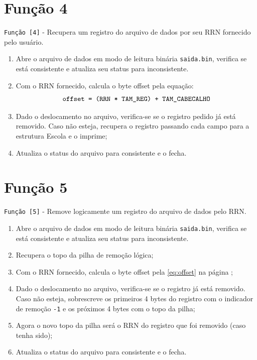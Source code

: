 \documentclass[
	12pt,				%
	openany,			%
	twoside,			%
	a4paper,			%
	english,			%
	french,				%
	spanish,			%
	brazil,				%
	]{abntex2}
\begin{document}
\section{Função 4}

\verb|Função [4]| - Recupera um registro do arquivo de dados por seu RRN fornecido pelo usuário.
\begin{enumerate}
    \item Abre o arquivo de dados em modo de leitura binária \verb|saida.bin|, verifica se está consistente e atualiza seu status para inconsistente.
    \item Com o RRN fornecido, calcula o byte offset pela equação:
    \begin{equation}
        \verb|offset = (RRN * TAM_REG) + TAM_CABECALHO|
        \label{eq:offset}
    \end{equation}
    \item Dado o deslocamento no arquivo, verifica-se se o registro pedido já está removido. Caso não esteja, recupera o registro passando cada campo para a estrutura Escola e o imprime;
    \item Atualiza o status do arquivo para consistente e o fecha.
   
\end{enumerate}

\section{Função 5}
\verb|Função [5]| - Remove logicamente um registro do arquivo de dados pelo RRN.

\begin{enumerate}
    \item Abre o arquivo de dados em modo de leitura binária \verb|saida.bin|, verifica se está consistente e atualiza seu status para inconsistente.
    \item Recupera o topo da pilha de remoção lógica;
    \item Com o RRN fornecido, calcula o byte offset pela \autoref{eq:offset} na página \pageref{eq:offset};
    \item Dado o deslocamento no arquivo, verifica-se se o registro já está removido. Caso não esteja, sobrescreve os primeiros 4 bytes do registro com o indicador de remoção \verb|-1| e os próximos 4 bytes com o topo da pilha;
    \item Agora o novo topo da pilha será o RRN do registro que foi removido (caso tenha sido);
    \item Atualiza o status do arquivo para consistente e o fecha.
\end{enumerate}
\end{document}
